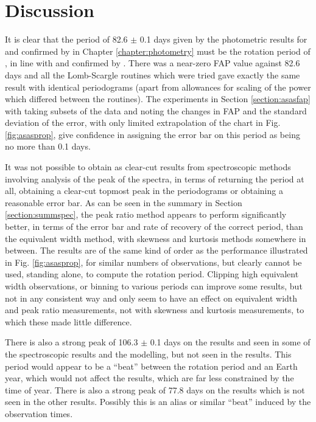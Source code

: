 \chapter{Discussion}
\protect\label{chapter:discussion}

It is clear that the period of 82.6 $\pm$ 0.1 days given by the photometric results for {\asas} and confirmed by {\hst}
in Chapter \ref{chapter:photometry} must be the rotation period of \prox, in line with \citet{benedict98} and confirmed
by \citet{kiraga07}.  There was a near-zero FAP value against 82.6 days and all the Lomb-Scargle routines which were tried gave
exactly the same result with identical periodograms (apart from allowances for scaling of the power which differed
between the routines). The experiments in Section \ref{section:asasfap} with taking subsets of the data and noting the
changes in FAP and the standard deviation of the error, with only limited extrapolation of the chart in
Fig. \ref{fig:asasprop}, give confidence in assigning the error bar on this period as being no more than 0.1 days.

It was not possible to obtain as clear-cut results from spectroscopic methods involving analysis of the {\ha} peak of
the {\prox} spectra, in terms of returning the period at all, obtaining a clear-cut topmost peak in the periodograms or
obtaining a reasonable error bar. As can be seen in the summary in Section \ref{section:summspec}, the peak ratio method
appears to perform significantly better, in terms of the error bar and rate of recovery of the correct period, than the
equivalent width method, with skewness and kurtosis methods somewhere in between. The results are of the same kind of
order as the performance illustrated in Fig. \ref{fig:asasprop}, for similar numbers of observations, but clearly cannot
be used, standing alone, to compute the rotation period. Clipping high equivalent width observations, or binning to
various periods can improve some results, but not in any consistent way and only seem to have an effect on equivalent
width and peak ratio measurements, not with skewness and kurtosis measurements, to which these made little difference.

There is also a strong peak of 106.3 $\pm$ 0.1 days on the {\asas} results and seen in some of the spectroscopic results
and the modelling, but not seen in the {\hst} results. This period would appear to be a ``beat'' between the rotation
period and an Earth year, which would not affect the {\hst} results, which are far less constrained by the time of
year. There is also a strong peak of 77.8 days on the {\hst} results which is not seen in the other results. Possibly
this is an alias or similar ``beat'' induced by the {\hst} observation times.

